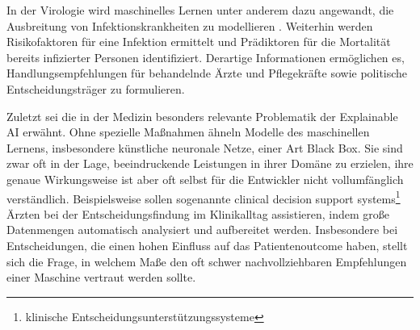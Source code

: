 In der Virologie wird maschinelles Lernen unter anderem dazu angewandt, die Ausbreitung von Infektionskrankheiten zu modellieren \citep{9121027}. Weiterhin werden Risikofaktoren für eine Infektion ermittelt und Prädiktoren für die Mortalität bereits infizierter Personen identifiziert. Derartige Informationen ermöglichen es, Handlungsempfehlungen für behandelnde Ärzte und Pflegekräfte \citep{colubriMachineLearningPrognosticModels2019} sowie politische Entscheidungsträger \citep{satuMachineLearningBasedApproaches2020} zu formulieren.

Zuletzt sei die in der Medizin besonders relevante Problematik der Explainable AI erwähnt. Ohne spezielle Maßnahmen ähneln Modelle des maschinellen Lernens, insbesondere künstliche neuronale Netze, einer Art Black Box. Sie sind zwar oft in der Lage, beeindruckende Leistungen in ihrer Domäne zu erzielen, ihre genaue Wirkungsweise ist aber oft selbst für die Entwickler nicht vollumfänglich verständlich. Beispielsweise sollen sogenannte clinical decision support systems\footnote{klinische Entscheidungsunterstützungssysteme} Ärzten bei der Entscheidungsfindung im Klinikalltag assistieren, indem große Datenmengen automatisch analysiert und aufbereitet werden. Insbesondere bei Entscheidungen, die einen hohen Einfluss auf das Patientenoutcome haben, stellt sich die Frage, in welchem Maße den oft schwer nachvollziehbaren Empfehlungen einer Maschine vertraut werden sollte.